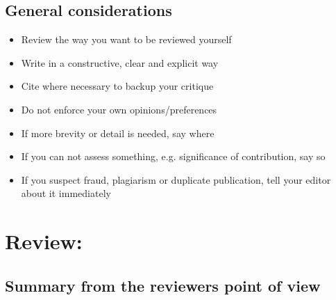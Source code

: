

\section*{General considerations}
\begin{itemize}[resume]
    \item Review the way you want to be reviewed yourself
    \item Write in a constructive, clear and explicit way
    \item Cite where necessary to backup your critique
    \item Do not enforce your own opinions/preferences
    \item If more brevity or detail is needed, say where
    \item If you can not assess something, e.g. significance of contribution, say so
    \item If you suspect fraud, plagiarism or duplicate publication, tell your editor about it immediately
\end{itemize}

\chapter*{Review: \textcolor{HighlightColor}{\metaTitle}}\minitoc\label{sec:review}\vspace{.5cm}
\setcounter{chapter}{1}

\section*{Summary from the reviewers point of view}\label{sec:summary}
\noindent\lipsum[7]

